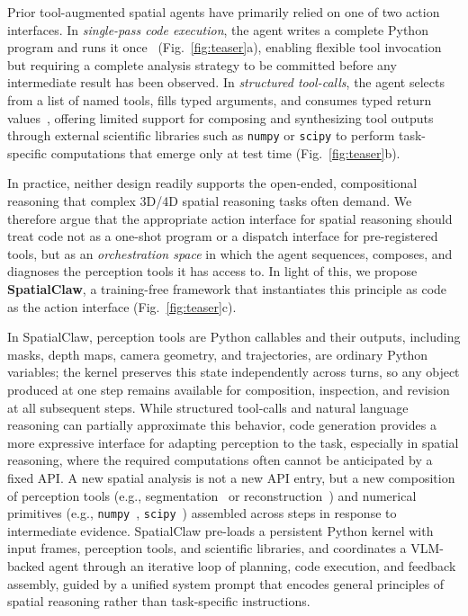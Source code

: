 \documentclass{llmxive}
\providecommand{\ours}{SpatialClaw}
\begin{document}
Prior tool-augmented spatial agents have primarily relied on one of two action interfaces.
In \emph{single-pass code execution}, the agent writes a complete Python program and runs it once~\citep{luo2026pyspatial,marsili2025visual} (Fig.~\ref{fig:teaser}a), enabling flexible tool invocation but requiring a complete analysis strategy to be committed before any intermediate result has been observed.
In \emph{structured tool-calls}, the agent selects from a list of named tools, fills typed arguments, and consumes typed return values~\citep{chen2025geometrically,chen2025spacetools,ropero2026riemind}, offering limited support for composing and synthesizing tool outputs through external scientific libraries such as \texttt{numpy} or \texttt{scipy} to perform task-specific computations that emerge only at test time (Fig.~\ref{fig:teaser}b).

In practice, neither design readily supports the open-ended, compositional reasoning that complex 3D/4D spatial reasoning tasks often demand.
We therefore argue that the appropriate action interface for spatial reasoning should treat code not as a one-shot program or a dispatch interface for pre-registered tools, but as an \emph{orchestration space} in which the agent sequences, composes, and diagnoses the perception tools it has access to. In light of this, we propose \textbf{\ours{}}, a training-free framework that instantiates this principle as code as the action interface (Fig.~\ref{fig:teaser}c).

In \ours{}, perception tools are Python callables and their outputs, including masks, depth maps, camera geometry, and trajectories, are ordinary Python variables; the kernel preserves this state independently across turns, so any object produced at one step remains available for composition, inspection, and revision at all subsequent steps.
While structured tool-calls and natural language reasoning can partially approximate this behavior, code generation provides a more expressive interface for adapting perception to the task, especially in spatial reasoning, where the required computations often cannot be anticipated by a fixed API.
A new spatial analysis is not a new API entry, but a new composition of perception tools (e.g., segmentation~\citep{carion2025sam} or reconstruction~\citep{depthanything3}) and numerical primitives (e.g., \texttt{numpy}~\citep{harris2020array}, \texttt{scipy}~\citep{2020SciPy-NMeth}) assembled across steps in response to intermediate evidence.
\ours{} pre-loads a persistent Python kernel with input frames, perception tools, and scientific libraries, and coordinates a VLM-backed agent through an iterative loop of planning, code execution, and feedback assembly, guided by a unified system prompt that encodes general principles of spatial reasoning rather than task-specific instructions.
\end{document}
